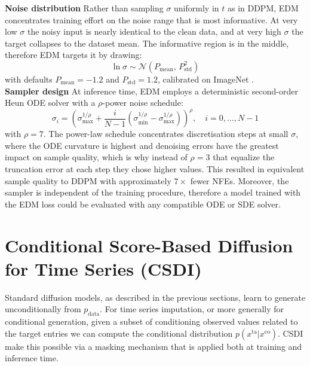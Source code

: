 \textbf{Noise distribution} Rather than sampling $\sigma$ uniformly in $t$ as in DDPM, EDM concentrates training effort on the noise range that is most informative. At very low $\sigma$ the noisy input is nearly identical to the clean data, and at very 
high $\sigma$ the target collapses to the dataset mean. The informative region is in the middle, therefore EDM targets it by drawing:
\begin{equation}
    \label{eq:edm_sigma_sampling}
    \ln\sigma \sim \mathcal{N}(P_{\text{mean}},\, P_{\text{std}}^2)
\end{equation}
with defaults $P_{\text{mean}} = -1.2$ and $P_{\text{std}} = 1.2$, calibrated 
on ImageNet \cite{deng2009imagenet}.\\

\textbf{Sampler design}
At inference time, EDM employs a deterministic second-order Heun ODE solver with 
a $\rho$-power noise schedule:
$$
\sigma_i = \left(\sigma_{\text{max}}^{1/\rho} + \frac{i}{N-1}
\left(\sigma_{\text{min}}^{1/\rho} - \sigma_{\text{max}}^{1/\rho}\right)
\right)^{\!\rho}, \quad i = 0, \dots, N-1
$$
with $\rho = 7$. The power-law schedule concentrates discretisation steps at 
small $\sigma$, where the ODE curvature is highest and denoising errors have the 
greatest impact on sample quality, which is why instead of \(\rho=3\) that equalize the truncation error at each step they chose higher values. This resulted in equivalent sample quality to DDPM with approximately $7\times$ fewer NFEs. Moreover, the sampler is independent of the training procedure, therefore a model trained with the EDM loss could be evaluated with any compatible ODE or SDE solver.

\section{Conditional Score-Based Diffusion for Time Series (CSDI)}
\label{sec:csdi_literature}

Standard diffusion models, as described in the previous sections, learn to 
generate unconditionally from $p_{\text{data}}$. For time series imputation, or more generally for conditional generation, given a subset of conditioning observed values related to the target entries we can compute the conditional distribution $p(x^{\text{ta}} | x^{\text{co}})$. CSDI \cite{tashiro2021csdi} make this possible via a masking mechanism that is applied both at training and inference time.\\

